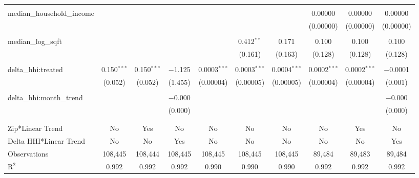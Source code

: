 \begin{table}[H]
{\begin{tabular}{@{\extracolsep{5pt}}lccccccccc}
   & & & & & & & & & \\  

  median\_household\_income &  &  &  &  &  &  & 0.00000 & 0.00000 & 0.00000 \\  

   &  &  &  &  &  &  & (0.00000) & (0.00000) & (0.00000) \\  

   & & & & & & & & & \\  

  median\_log\_sqft &  &  &  &  & 0.412$^{**}$ & 0.171 & 0.100 & 0.100 & 0.100 \\  

   &  &  &  &  & (0.161) & (0.163) & (0.128) & (0.128) & (0.128) \\  

   & & & & & & & & & \\  

  delta\_hhi:treated & 0.150$^{***}$ & 0.150$^{***}$ & $-$1.125 & 0.0003$^{***}$ & 0.0003$^{***}$ & 0.0004$^{***}$ & 0.0002$^{***}$ & 0.0002$^{***}$ & $-$0.0001 \\  

   & (0.052) & (0.052) & (1.455) & (0.00004) & (0.00005) & (0.00005) & (0.00004) & (0.00004) & (0.001) \\  

   & & & & & & & & & \\  

  delta\_hhi:month\_trend &  &  & $-$0.000 &  &  &  &  &  & $-$0.000 \\  

   &  &  & (0.000) &  &  &  &  &  & (0.000) \\  

   & & & & & & & & & \\  

 \hline \\[-1.8ex]  

 Zip*Linear Trend & No & Yes & No & No & No & No & No & Yes & No \\  

 Delta HHI*Linear Trend & No & No & Yes & No & No & No & No & No & Yes \\  

 Observations & 108,445 & 108,444 & 108,445 & 108,445 & 108,445 & 108,445 & 89,484 & 89,483 & 89,484 \\  

 R$^{2}$ & 0.992 & 0.992 & 0.992 & 0.990 & 0.990 & 0.990 & 0.992 & 0.992 & 0.992 \\  


\end{tabular}}
\end{table}
